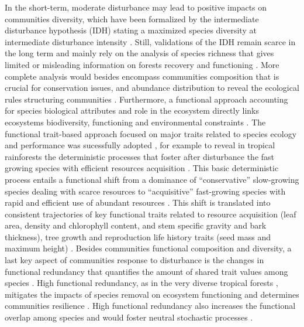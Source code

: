 \documentclass[fleqn,10pt]{ArtEcoFoG} %
\theoremstyle{definition}
\theoremstyle{definition}
\theoremstyle{definition}
\theoremstyle{remark}
\begin{document}
In the short-term, moderate disturbance may lead to positive
impacts on communities diversity, which have been formalized by the
intermediate disturbance hypothesis (IDH) stating a maximized species
diversity at intermediate disturbance intensity
\citep{Molino2001, Kariuki2006a, Berry2008a}. Still, validations of the
IDH remain scarce in the long term and mainly rely on the analysis of
species richness that gives limited or misleading information on forests
recovery and functioning \citep{Martin2015, Chaudhary2016}. More
complete analysis would besides encompass communities
composition that is crucial for conservation issues, and abundance distribution
to reveal the ecological rules structuring communities
\citep{Magurran1988, Lavorel2002, Bellwood2006}. Furthermore, a
functional approach accounting for species biological attributes and
role in the ecosystem directly links ecosystems biodiversity,
functioning and environmental constraints
\citep{Violle2007b, Moretti2009, Baraloto2012a, Scheiter2013}. The
functional trait-based approach focused on major traits related to
species ecology and performance was sucessfully adopted
\citep{Diaz2005, Villeger2008a}, for example to reveal in tropical
rainforests the deterministic processes that foster after disturbance
the fast growing species with efficient resources acquisition
\citep{Molino2001, Haddad2008, Ruger2009}. This basic deterministic
process entails a functional shift from a dominance of ``conservative''
slow-growing species dealing with scarce resources to ``acquisitive''
fast-growing species with rapid and efficient use of abundant resources
\citep{TerSteege2001, Reich2014, Herault2011}. This shift is translated
into consistent trajectories of key functional traits related to
resource acquisition (leaf area, density and chlorophyll content, and
stem specific gravity and bark thickness), tree growth and reproduction
life history traits (seed mass and maximum height)
\citep{Wright2004, TerSteege2006, Westoby2006a, Chave2009b}. Besides
communities functional composition and diversity, a last key aspect of
communities response to disturbance is the changes in functional
redundancy that quantifies the amount of shared trait values among
species \citep{Carmona2016}. High functional redundancy, as in the very
diverse tropical forests \citep{Bellwood2006}, mitigates the impacts of
species removal on ecosystem functioning and determines communities
resilience \citep{Trenbath1999, Elmqvist2003, Diaz2005}. High functional
redundancy also increases the functional overlap among species and would
foster neutral stochastic processes \citep{Gravel2006}.
\end{document}
